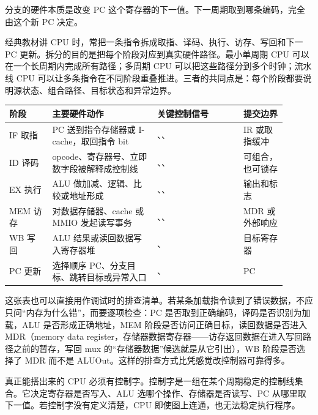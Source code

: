 分支的硬件本质是改变 PC 这个寄存器的下一值。下一周期取到哪条编码，完全由这个新 PC 决定。

经典教材讲 CPU 时，常把一条指令拆成取指、译码、执行、访存、写回和下一 PC 更新。拆分的目的是把每个阶段对应到真实硬件路径。最小单周期 CPU 可以在一个长周期内完成所有路径；多周期 CPU 可以把这些路径分到多个时钟；流水线 CPU 可以让多条指令在不同阶段重叠推进。三者的共同点是：每个阶段都要说明源状态、组合路径、目标状态和异常边界。

\begin{longtable}{L{0.14\linewidth}L{0.34\linewidth}L{0.28\linewidth}L{0.14\linewidth}}
\toprule
阶段 & 主要硬件动作 & 关键控制信号 & 提交边界 \\
\midrule
IF 取指 & PC 送到指令存储器或 I-cache，取回指令 bit & 、、 & IR 或取指缓冲 \\
ID 译码 & opcode、寄存器号、立即数字段被解释成控制线 & 、、 & 可组合，也可锁存 \\
EX 执行 & ALU 做加减、逻辑、比较或地址形成 & 、、 & 输出和标志 \\
MEM 访存 & 对数据存储器、cache 或 MMIO 发起读写事务 & 、、 & MDR 或外部响应 \\
WB 写回 & ALU 结果或读回数据写入寄存器堆 & 、 & 目标寄存器 \\
PC 更新 & 选择顺序 PC、分支目标、跳转目标或异常入口 & 、 & PC \\
\bottomrule
\end{longtable}

这张表也可以直接用作调试时的排查清单。若某条加载指令读到了错误数据，不应只问“内存为什么错”，而要逐项检查：PC 是否取到正确编码，译码是否识别为加载，ALU 是否形成正确地址，MEM 阶段是否访问正确目标，读回数据是否进入 MDR（memory data register，存储器数据寄存器——访存返回数据在进入写回路径之前的暂存，写回 mux 的“存储器数据”候选就是从它引出），WB 阶段是否选择了 MDR 而不是 ALUOut。这样的排查方式比凭感觉改控制器可靠得多。

真正能搭出来的 CPU 必须有控制字。控制字是一组在某个周期稳定的控制线集合。它决定寄存器是否写入、ALU 选哪个操作、存储器是否读写、PC 从哪里取下一值。若控制字没有定义清楚，CPU 即使图上连通，也无法稳定执行程序。


